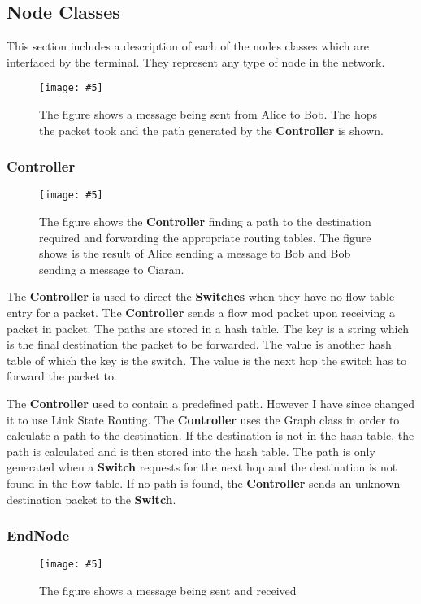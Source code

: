 \documentclass{article}
\newcommand{\includescalefigure}[5]{
  \begin{figure}[H]
    \centering
    \texttt{[image: \#5]}
    \captionsetup{width=.8\linewidth}
    \caption[#2]{#3}
    \label{#1}
  \end{figure}
}
\begin{document}
\subsection{Node Classes}
This section includes a description of each of the nodes classes which are
interfaced by the terminal. They represent any type of node in the network.

\includescalefigure{SampleUsage}{Sample usage of protocol}{The figure shows a
  message being sent from Alice to Bob. The hops the packet took and the path
generated by the \textbf{Controller} is shown.}{1}{SampleUsage.png}

\subsubsection{Controller}

\includescalefigure{ControllerRoutePacketForwarding}{Controller doing work}{The
  figure shows the \textbf{Controller} finding a path to the destination
  required and forwarding the appropriate routing tables. The figure shows is
  the result of Alice sending a message to Bob and Bob sending a message to
Ciaran.}{1}{ControllerRoutePacketForwarding.png}

The \textbf{Controller} is used to direct the \textbf{Switches} when they have
no flow table entry for a packet. The \textbf{Controller} sends a flow mod
packet upon receiving a packet in packet. The paths are stored in a hash table.
The key is a string which is the final destination the packet to be forwarded.
The value is another hash table of which the key is the switch. The value is the
next hop the switch has to forward the packet to.

The \textbf{Controller} used to contain a predefined path. However I have since
changed it to use Link State Routing. The \textbf{Controller} uses the Graph
class in order to calculate a path to the destination. If the destination is not
in the hash table, the path is calculated and is then stored into the hash table.
The path is only generated when a \textbf{Switch} requests for the next hop and
the destination is not found in the flow table. If no path is found, the
\textbf{Controller} sends an unknown destination packet to the \textbf{Switch}.

\subsubsection{EndNode}

\includescalefigure{EndNodeMessageSend}{Message send and
  receive}{The figure shows a message being sent and
received}{1}{EndNodeMessageSend.png}
\end{document}
